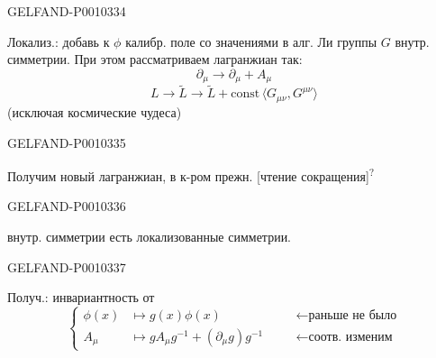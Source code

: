 \begin{GelfandAdjacentEvidence}{GELFAND-P001033}{4}


Локализ.: добавь к $\phi$ калибр. поле со значениями в алг. Ли группы $G$ внутр. симметрии. При этом рассматриваем лагранжиан так:
\[
\partial_\mu\to\partial_\mu+A_\mu
\]
\begin{equation*}
L\to\widetilde L\to\widetilde L+\mathrm{const}\,\langle G_{\mu\nu},G^{\mu\nu}\rangle
\tag{4}
\end{equation*}
(исключая космические чудеса)
\end{GelfandAdjacentEvidence}
\begin{GelfandAdjacentEvidence}{GELFAND-P001033}{5}


Получим новый лагранжиан, в к-ром прежн. [чтение сокращения]\textsuperscript{?}
\end{GelfandAdjacentEvidence}
\begin{GelfandAdjacentEvidence}{GELFAND-P001033}{6}

внутр. симметрии есть локализованные симметрии.
\end{GelfandAdjacentEvidence}
\begin{GelfandAdjacentEvidence}{GELFAND-P001033}{7}


Получ.: инвариантность от
\begin{equation*}
\left\{\begin{aligned}
\phi(x)&\mapsto g(x)\phi(x)
&\quad&\longleftarrow \text{раньше не было}\\
A_\mu&\mapsto gA_\mu g^{-1}+(\partial_\mu g)g^{-1}
&&\longleftarrow \text{соотв. изменим}
\end{aligned}\right.
\tag{5}
\end{equation*}
\end{GelfandAdjacentEvidence}



